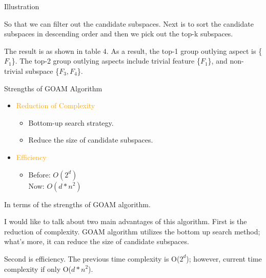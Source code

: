 \documentclass[
 size=14pt,
 paper=smartboard,  %
 mode=present, 		%
 display=slides, 	%
 style=tuliplab,  	%
 pauseslide,
 fleqn,leqno]{powerdot}
\begin{document}
\begin{slide}[toc=,bm=]{Illustration}
\begin{note}
So that we can filter out the candidate subspaces.
Next is to sort the candidate subspaces in
descending order and then we pick out the top-k subspaces.

The result is as shown in table $4$.
As a result,
the top-1 group outlying aspect is \{$F_1$\}.
The top-2 group outlying aspects include
trivial feature \{$F_1$\},
and non-trivial subspace \{$F_3, F_4$\}.
\end{note}

\end{slide}


\begin{slide}[toc=,bm=]{Strengths of GOAM Algorithm}
\begin{itemize}
\item
\textcolor{orange}{Reduction of Complexity}

\begin{itemize}
\item
Bottom-up search strategy.

\item
Reduce the size of candidate subspaces.

\end{itemize}

\item
\textcolor{orange}{Efficiency}

\begin{itemize}
\item
Before: $O(2^d)$  \\
Now:    $O(d*n^{2})$

\end{itemize}
\end{itemize}

\begin{note}
In terms of the strengths of GOAM algorithm.

I would like to talk about two main advantages of this algorithm.
First is the reduction of complexity.
GOAM algorithm utilizes the bottom up search method;
what's more,
it can reduce the size of candidate subspaces.

Second is efficiency.
The previous time complexity is O($2^d$);
however,
current time complexity if only O($d*n^2$).
\end{note}

\end{slide}
\end{document}
